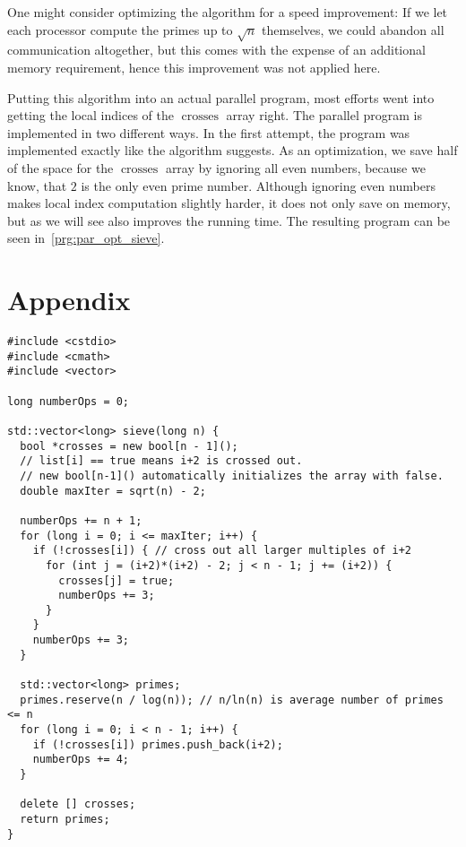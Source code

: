 \documentclass[a4paper,12pt]{article}
\DeclareMathOperator{\crosses}{crosses}
\begin{document}
One might consider optimizing the algorithm for a speed improvement:
If we let each processor compute the primes up to $\sqrt{n}$ themselves, we could abandon all communication altogether, but this comes with the expense of an additional memory requirement, hence this improvement was not applied here.

Putting this algorithm into an actual parallel program, most efforts went into getting the local indices of the $\crosses$ array right.
The parallel program is implemented in two different ways.
In the first attempt, the program was implemented exactly like the algorithm suggests.
As an optimization, we save half of the space for the $\crosses$ array by ignoring all even numbers, because we know, that $2$ is the only even prime number.
Although ignoring even numbers makes local index computation slightly harder, it does not only save on memory, but as we will see also improves the running time.
The resulting program can be seen in~\autoref{prg:par_opt_sieve}.




\pagebreak
\appendix
\section{Appendix}

 	\begin{lstlisting}[caption={Sequential implementation of the Sieve of Eratosthenes}, label={prg:seq_sieve}, frame={single}]
#include <cstdio>
#include <cmath>
#include <vector>

long numberOps = 0;

std::vector<long> sieve(long n) {
  bool *crosses = new bool[n - 1]();
  // list[i] == true means i+2 is crossed out.
  // new bool[n-1]() automatically initializes the array with false.
  double maxIter = sqrt(n) - 2;

  numberOps += n + 1;
  for (long i = 0; i <= maxIter; i++) {
    if (!crosses[i]) { // cross out all larger multiples of i+2
      for (int j = (i+2)*(i+2) - 2; j < n - 1; j += (i+2)) {
        crosses[j] = true;
        numberOps += 3;
      }
    }
    numberOps += 3;
  }

  std::vector<long> primes;
  primes.reserve(n / log(n)); // n/ln(n) is average number of primes <= n
  for (long i = 0; i < n - 1; i++) {
    if (!crosses[i]) primes.push_back(i+2);
    numberOps += 4;
  }

  delete [] crosses;
  return primes;
}
	\end{lstlisting}
\end{document}
